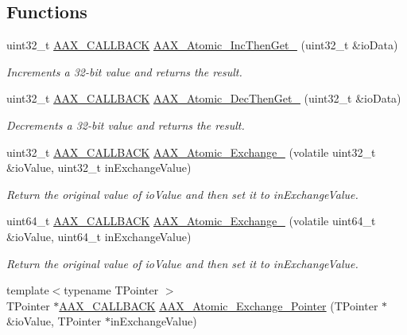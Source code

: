 \subsection*{Functions}
\begin{DoxyCompactItemize}
\item 
uint32\+\_\+t \mbox{\hyperlink{a00392_aaa22112139aa627574b1ef562f579d43}{A\+A\+X\+\_\+\+C\+A\+L\+L\+B\+A\+CK}} \mbox{\hyperlink{a00398_a56633d7039fae1d31c8984f9baafa17e}{A\+A\+X\+\_\+\+Atomic\+\_\+\+Inc\+Then\+Get\+\_}} (uint32\+\_\+t \&io\+Data)
\begin{DoxyCompactList}\small\item\em Increments a 32-\/bit value and returns the result. \end{DoxyCompactList}\item 
uint32\+\_\+t \mbox{\hyperlink{a00392_aaa22112139aa627574b1ef562f579d43}{A\+A\+X\+\_\+\+C\+A\+L\+L\+B\+A\+CK}} \mbox{\hyperlink{a00398_adb8e12a71f90de1328a4fde6dd22fc41}{A\+A\+X\+\_\+\+Atomic\+\_\+\+Dec\+Then\+Get\+\_}} (uint32\+\_\+t \&io\+Data)
\begin{DoxyCompactList}\small\item\em Decrements a 32-\/bit value and returns the result. \end{DoxyCompactList}\item 
uint32\+\_\+t \mbox{\hyperlink{a00392_aaa22112139aa627574b1ef562f579d43}{A\+A\+X\+\_\+\+C\+A\+L\+L\+B\+A\+CK}} \mbox{\hyperlink{a00398_a44eb82707be40dd559db9051317c10d0}{A\+A\+X\+\_\+\+Atomic\+\_\+\+Exchange\+\_}} (volatile uint32\+\_\+t \&io\+Value, uint32\+\_\+t in\+Exchange\+Value)
\begin{DoxyCompactList}\small\item\em Return the original value of io\+Value and then set it to in\+Exchange\+Value. \end{DoxyCompactList}\item 
uint64\+\_\+t \mbox{\hyperlink{a00392_aaa22112139aa627574b1ef562f579d43}{A\+A\+X\+\_\+\+C\+A\+L\+L\+B\+A\+CK}} \mbox{\hyperlink{a00398_a0a683337ef8627f1e2b01e69d5f11cb0}{A\+A\+X\+\_\+\+Atomic\+\_\+\+Exchange\+\_}} (volatile uint64\+\_\+t \&io\+Value, uint64\+\_\+t in\+Exchange\+Value)
\begin{DoxyCompactList}\small\item\em Return the original value of io\+Value and then set it to in\+Exchange\+Value. \end{DoxyCompactList}\item 
{\footnotesize template$<$typename T\+Pointer $>$ }\\T\+Pointer $\ast$\mbox{\hyperlink{a00392_aaa22112139aa627574b1ef562f579d43}{A\+A\+X\+\_\+\+C\+A\+L\+L\+B\+A\+CK}} \mbox{\hyperlink{a00398_a02803b3ea269d4ed4758a91eec9fa46c}{A\+A\+X\+\_\+\+Atomic\+\_\+\+Exchange\+\_\+\+Pointer}} (T\+Pointer $\ast$\&io\+Value, T\+Pointer $\ast$in\+Exchange\+Value)

\end{DoxyCompactItemize}
